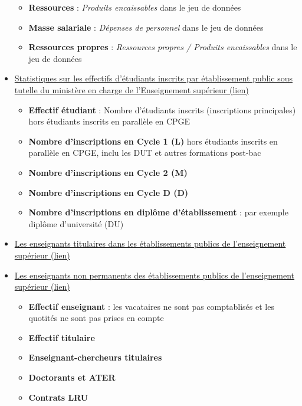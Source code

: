 \documentclass[12pt,french,landscape]{article}
\providecommand{\tightlist}{%
  \setlength{\itemsep}{0pt}\setlength{\parskip}{0pt}}
\begin{document}
\begin{multicols}{2}
\begin{itemize}
  \begin{itemize}
  \tightlist
  \item
    \textbf{Ressources} : \emph{Produits encaissables} dans le jeu de
    données
  \item
    \textbf{Masse salariale} : \emph{Dépenses de personnel} dans le jeu
    de données
  \item
    \textbf{Ressources propres} : \emph{Ressources propres / Produits
    encaissables} dans le jeu de données
  \end{itemize}
\item
  \href{https://data.enseignementsup-recherche.gouv.fr/explore/dataset/fr-esr-statistiques-sur-les-effectifs-d-etudiants-inscrits-par-etablissement/}{Statistiques
  sur les effectifs d'étudiants inscrits par établissement public sous
  tutelle du ministère en charge de l'Enseignement supérieur (lien)}

  \begin{itemize}
  \tightlist
  \item
    \textbf{Effectif étudiant} : Nombre d'étudiants inscrits
    (inscriptions principales) hors étudiants inscrits en parallèle en
    CPGE
  \item
    \textbf{Nombre d'inscriptions en Cycle 1 (L)} hors étudiants
    inscrits en parallèle en CPGE, inclu les DUT et autres formations
    post-bac
  \item
    \textbf{Nombre d'inscriptions en Cycle 2 (M)}
  \item
    \textbf{Nombre d'inscriptions en Cycle D (D)}
  \item
    \textbf{Nombre d'inscriptions en diplôme d'établissement} : par
    exemple diplôme d'université (DU)
  \end{itemize}
\item
  \href{https://data.enseignementsup-recherche.gouv.fr/explore/dataset/fr-esr-enseignants-titulaires-esr-public/}{Les
  enseignants titulaires dans les établissements publics de
  l'enseignement supérieur (lien)}
\item
  \href{https://data.enseignementsup-recherche.gouv.fr/explore/dataset/fr-esr-enseignants-nonpermanents-esr-public/}{Les
  enseignants non permanents des établissements publics de
  l'enseignement supérieur (lien)}

  \begin{itemize}
  \tightlist
  \item
    \textbf{Effectif enseignant} : les vacataires ne sont pas
    comptablisés et les quotités ne sont pas prises en compte
  \item
    \textbf{Effectif titulaire}
  \item
    \textbf{Enseignant-chercheurs titulaires}
  \item
    \textbf{Doctorants et ATER}
  \item
    \textbf{Contrats LRU}
  \end{itemize}
\end{itemize}


\end{multicols}
\end{document}
